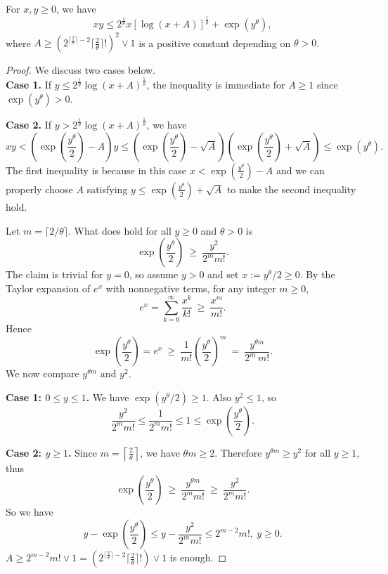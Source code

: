 \documentclass[10pt,a4paper]{amsart}
\begin{document}
\begin{lemma}\label{young}
For $x, y \ge 0$, we have
\[
xy \leq 2^{\frac{1}{\theta}} x [\log(x + A)]^{\frac{1}{\theta}} + \exp(y^\theta),
\]
where $A\ge (2^{\lceil \frac{2}{\theta} \rceil-2} \lceil \frac{2}{\theta} \rceil !)^2 \vee 1$ is a positive constant depending on $\theta>0$.
\end{lemma}

\begin{proof}
We discuss two cases below.\\ 

\textbf{Case 1.} If $y \leq 2^{\frac{1}{\theta}} \log(x + A)^{\frac{1}{\theta}}$, the inequality is immediate for $A\ge 1$ since $\exp(y^\theta)>0$.

\textbf{Case 2.} If $y > 2^{\frac{1}{\theta}} \log(x+A)^{\frac{1}{\theta}}$, we have
\[
xy < \left(\exp(\frac{y^\theta}{2}) - A \right) y \leq \left(\exp(\frac{y^\theta}{2}) - \sqrt{A} \right)\left(\exp(\frac{y^\theta}{2}) + \sqrt{A}\right) \leq \exp(y^\theta).
\]
The first inequality is because in this case $x<\exp(\frac{y^\theta}{2})-A$ and we can properly choose $A$ satisfying $y\leq \exp(\frac{y^\theta}{2})+\sqrt{A}$ to make the second inequality hold.

Let \(m=\lceil 2/\theta\rceil\). What does hold for all \(y\ge 0\) and \(\theta>0\) is
\[
\exp\left(\frac{y^\theta}{2}\right)\ \ge\ \frac{y^2}{2^mm!}.
\]
The claim is trivial for $y=0$, so assume $y>0$ and set $x:=y^\theta/2\ge 0$.
By the Taylor expansion of $e^x$ with nonnegative terms, for any integer $m\ge 0$,
\[
e^x=\sum_{k=0}^{\infty}\frac{x^k}{k!}\ \ge\ \frac{x^m}{m!}.
\]
Hence
\[
\exp\!\left(\frac{y^\theta}{2}\right)=e^x
\ \ge\ \frac{1}{m!}\left(\frac{y^\theta}{2}\right)^m
\ =\ \frac{y^{\theta m}}{2^m\,m!}.
\]
We now compare $y^{\theta m}$ and $y^2$.

\textbf{Case 1: $0\le y\le 1$.}
We have $\exp(y^\theta/2)\ge 1$. Also $y^2\le 1$, so
\[
\frac{y^2}{2^m m!}\le \frac{1}{2^m m!}\le 1 \le \exp\!\left(\frac{y^\theta}{2}\right).
\]

\textbf{Case 2: $y\ge 1$.}
Since $m=\left\lceil \frac{2}{\theta}\right\rceil$, we have $\theta m\ge 2$.
Therefore $y^{\theta m}\ge y^2$ for all $y\ge 1$, thus
\[
\exp\!\left(\frac{y^\theta}{2}\right)\ \ge\ \frac{y^{\theta m}}{2^m m!}
\ \ge\ \frac{y^2}{2^m m!}.
\]
So we have
\[
y-\exp\left(\frac{y^\theta}{2}\right) \le y-\frac{y^2}{2^mm!}\le 2^{m-2}m!,~y \ge 0.
\]
$A\ge 2^{m-2}m! \vee 1= (2^{\lceil \frac{2}{\theta} \rceil-2} \lceil \frac{2}{\theta} \rceil !)\vee 1$ is enough.

\end{proof}
\end{document}
